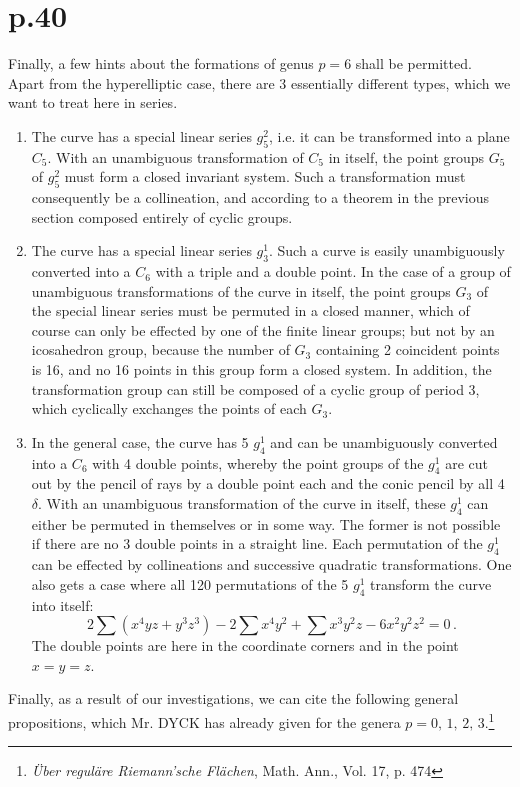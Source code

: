 \documentclass[leqno]{article}
\begin{document}
\section{p.40}
Finally, a few hints about the formations of genus $p=6$ shall be permitted. Apart from the hyperelliptic case, there are 3 essentially different types, which we want to treat here in series.
\begin{enumerate}[label=\arabic*)]
	\item The curve has a special linear series $g_5^2$, i.e. it can be transformed into a plane $C_5$. With an unambiguous transformation of $C_5$ in itself, the point groups $G_5$ of $g_5^2$ must form a closed invariant system. Such a transformation must consequently be a collineation, and according to a theorem in the previous section composed entirely of cyclic groups.
	\item The curve has a special linear series $g_3^1$. Such a curve is easily unambiguously converted into a $C_6$ with a triple and a double point. In the case of a group of unambiguous transformations of the curve in itself, the point groups $G_3$ of the special linear series must be permuted in a closed manner, which of course can only be effected by one of the finite linear groups; but not by an icosahedron group, because the number of $G_3$ containing 2 coincident points is 16, and no 16 points in this group form a closed system. In addition, the transformation group can still be composed of a cyclic group of period 3, which cyclically exchanges the points of each $G_3$.
	\item In the general case, the curve has 5 $g_4^1$ and can be unambiguously converted into a $C_6$ with 4 double points, whereby the point groups of the $g_4^1$ are cut out by the pencil of rays by a double point each and the conic pencil by all 4 $\delta$. With an unambiguous transformation of the curve in itself, these $g_4^1$ can either be permuted in themselves or in some way. The former is not possible if there are no 3 double points in a straight line. Each permutation of the $g_4^1$ can be effected by collineations and successive quadratic transformations. One also gets a case where all 120 permutations of the 5 $g_4^1$ transform the curve into itself: 
	\[
	2 \sum (x^4 y z + y^3 z^3) - 2 \sum x^4 y^2 + \sum x^3 y^2 z - 6 x^2 y^2 z^2 = 0 \, . 
	\]
	The double points are here in the coordinate corners and in the point $x=y=z$.
\end{enumerate}
Finally, as a result of our investigations, we can cite the following general propositions, which Mr. DYCK has already given for the genera $p=0, \, 1, \, 2, \, 3$.\footnote{\textit{\"Uber regul\"are Riemann'sche Fl\"achen}, Math. Ann., Vol. 17, p. 474} \\
\end{document}
